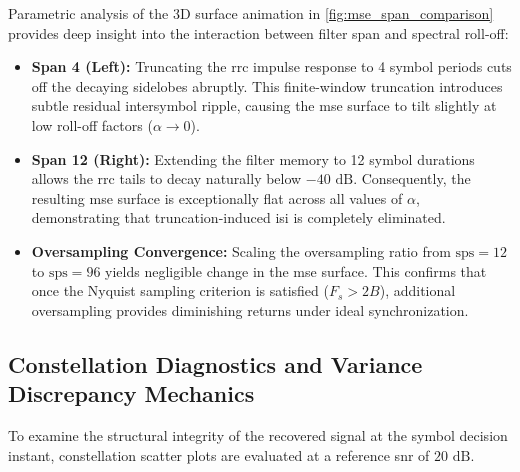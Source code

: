 \documentclass[Markos_Delaportas_1316.tex]{subfiles}
\begin{document}
Parametric analysis of the 3D surface animation in
\cref{fig:mse_span_comparison} provides deep insight into the interaction
between filter span and spectral roll-off:
\begin{itemize}
    \item \textbf{Span 4 (Left):} Truncating the \gls{rrc} impulse
        response to 4 symbol periods cuts off the decaying sidelobes
        abruptly. This finite-window truncation introduces subtle
        residual intersymbol ripple, causing the \gls{mse} surface to
        tilt slightly at low roll-off factors ($\alpha \to 0$).
    \item \textbf{Span 12 (Right):} Extending the filter memory to 12
        symbol durations allows the \gls{rrc} tails to decay
        naturally below $-40\text{ dB}$. Consequently, the resulting
        \gls{mse} surface is exceptionally flat across all values
        of $\alpha$, demonstrating that truncation-induced \gls{isi}
        is completely eliminated.
    \item \textbf{Oversampling Convergence:} Scaling the oversampling
        ratio from $\text{sps} = 12$ to $\text{sps} = 96$ yields
        negligible change in the \gls{mse} surface. This confirms
        that once the Nyquist sampling criterion is satisfied ($F_s > 2 B$),
        additional oversampling provides diminishing returns under
        ideal synchronization.
\end{itemize}

\subsection{Constellation Diagnostics and Variance Discrepancy Mechanics}
\label{subsec:constellation_diagnostics}
To examine the structural integrity of the recovered signal at the
symbol decision instant, constellation scatter plots
are evaluated at a reference \gls{snr} of $20\text{ dB}$.
\end{document}
